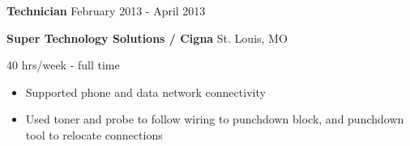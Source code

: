 \documentclass[../main.tex]{subfiles}
\begin{document}
\textbf{Technician} 
\hfill 
February 2013 - April 2013

\textbf{Super Technology Solutions / Cigna}
\hfill
St. Louis, MO

\hfill
40 hrs/week - full time
\begin{itemize}
\item Supported phone and data network connectivity
\item Used toner and probe to follow wiring to punchdown block, and punchdown tool to relocate connections
\end{itemize}
\end{document}
